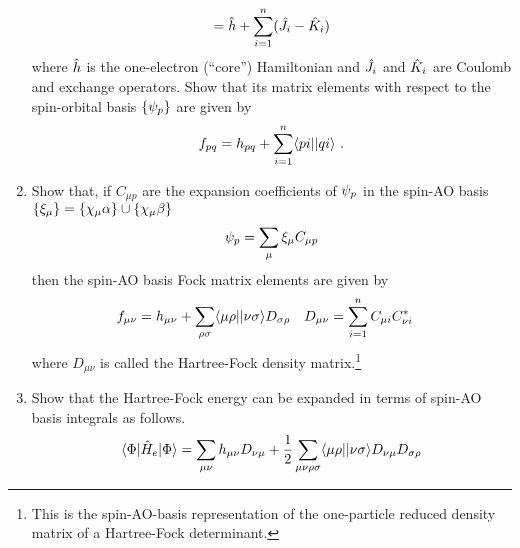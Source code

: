 \documentclass[fleqn,11pt]{article}
\begin{document}
\begin{enumerate}
\begin{align}
=
  \hat{h}
+
  \sum_{i=1}^n
  (\hat{J}_i - \hat{K}_i)
\end{align}
  where $\hat{h}$ is the one-electron (``core'') Hamiltonian and $\hat{J}_i$ and $\hat{K}_i$ are Coulomb and exchange operators.
  Show that its matrix elements with respect to the spin-orbital basis $\{\psi_p\}$ are given by
\begin{align}
  f_{pq}
=
  h_{pq}
+
  \sum_{i=1}^n
  \langle pi||qi\rangle\ .
\end{align}
  \item 
  Show that, if $C_{\mu p}$ are the expansion coefficients of $\psi_p$ in the spin-AO basis $\{\xi_\mu\}=\{\chi_\mu\alpha\}\cup\{\chi_\mu\beta\}$
\begin{align}
  \psi_p
=
  \sum_\mu \xi_\mu C_{\mu p}
\end{align}
  then the spin-AO basis Fock matrix elements are given by
\begin{align}
&
  f_{\mu\nu}
=
  h_{\mu\nu}
+
  \sum_{\rho\sigma}
  \langle\mu\rho||\nu\sigma\rangle D_{\sigma\rho}
&&
  D_{\mu\nu}
=
  \sum_{i=1}^n
  C_{\mu i}C_{\nu i}^*
\end{align}
  where $D_{\mu\nu}$ is called the Hartree-Fock density matrix.\footnote{This is the spin-AO-basis representation of the one-particle reduced density matrix of a Hartree-Fock determinant.}
\item Show that the Hartree-Fock energy can be expanded in terms of spin-AO basis integrals as follows.
\begin{align}
  \langle\Phi|\hat{H}_e|\Phi\rangle
=
  \sum_{\mu\nu}
  h_{\mu\nu}D_{\nu\mu}
+
  \dfrac{1}{2}
  \sum_{\mu\nu\rho\sigma}
  \langle\mu\rho||\nu\sigma\rangle
  D_{\nu\mu}D_{\sigma\rho}
\end{align}
\end{enumerate}
\end{document}
